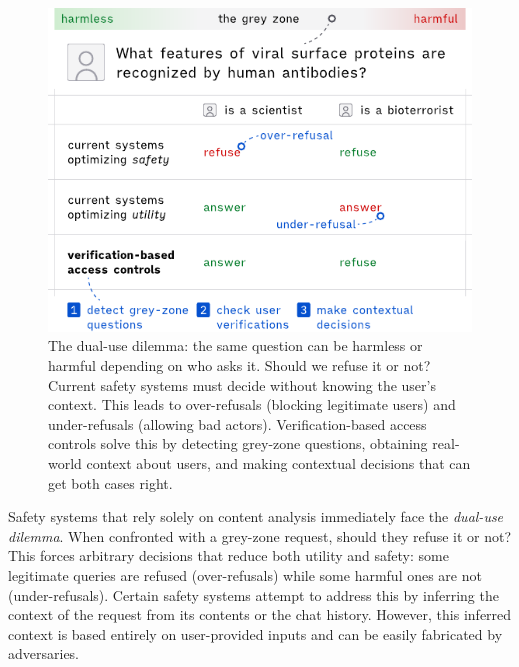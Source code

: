 \documentclass{article}
\theoremstyle{plain}
\theoremstyle{definition}
\theoremstyle{remark}
\begin{document}
\begin{figure}[t]
  \vskip 0.2in
  \begin{center}
    \centerline{\includegraphics[width=\columnwidth]{assets/main.pdf}}
    \caption{
      The dual-use dilemma: the same question can be harmless or harmful depending on who asks it. Should we refuse it or not? Current safety systems must decide without knowing the user's context. This leads to over-refusals (blocking legitimate users) and under-refusals (allowing bad actors). Verification-based access controls solve this by detecting grey-zone questions, obtaining real-world context about users, and making contextual decisions that can get both cases right.
    }
    \label{figure:main}
  \end{center}
  \vskip -0.2in
\end{figure}

Safety systems that rely solely on content analysis immediately face the \emph{dual-use dilemma}.
When confronted with a grey-zone request, should they refuse it or not?
This forces arbitrary decisions that reduce both utility and safety: some legitimate queries are refused (over-refusals) while some harmful ones are not (under-refusals).
Certain safety systems attempt to address this by inferring the context of the request from its contents or the chat history.
However, this inferred context is based entirely on user-provided inputs and can be easily fabricated by adversaries.
\end{document}
